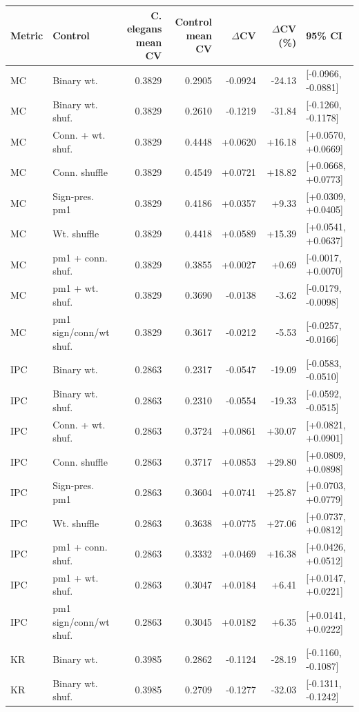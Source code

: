 \begin{tabular}{llrrrrl}
\toprule
Metric & Control & C. elegans mean CV & Control mean CV & $\Delta$CV & $\Delta$CV (\%) & 95\% CI \\
\midrule
MC & Binary wt. & 0.3829 & 0.2905 & -0.0924 & -24.13 & [-0.0966, -0.0881] \\
MC & Binary wt. shuf. & 0.3829 & 0.2610 & -0.1219 & -31.84 & [-0.1260, -0.1178] \\
MC & Conn. + wt. shuf. & 0.3829 & 0.4448 & +0.0620 & +16.18 & [+0.0570, +0.0669] \\
MC & Conn. shuffle & 0.3829 & 0.4549 & +0.0721 & +18.82 & [+0.0668, +0.0773] \\
MC & Sign-pres. pm1 & 0.3829 & 0.4186 & +0.0357 & +9.33 & [+0.0309, +0.0405] \\
MC & Wt. shuffle & 0.3829 & 0.4418 & +0.0589 & +15.39 & [+0.0541, +0.0637] \\
MC & pm1 + conn. shuf. & 0.3829 & 0.3855 & +0.0027 & +0.69 & [-0.0017, +0.0070] \\
MC & pm1 + wt. shuf. & 0.3829 & 0.3690 & -0.0138 & -3.62 & [-0.0179, -0.0098] \\
MC & pm1 sign/conn/wt shuf. & 0.3829 & 0.3617 & -0.0212 & -5.53 & [-0.0257, -0.0166] \\
IPC & Binary wt. & 0.2863 & 0.2317 & -0.0547 & -19.09 & [-0.0583, -0.0510] \\
IPC & Binary wt. shuf. & 0.2863 & 0.2310 & -0.0554 & -19.33 & [-0.0592, -0.0515] \\
IPC & Conn. + wt. shuf. & 0.2863 & 0.3724 & +0.0861 & +30.07 & [+0.0821, +0.0901] \\
IPC & Conn. shuffle & 0.2863 & 0.3717 & +0.0853 & +29.80 & [+0.0809, +0.0898] \\
IPC & Sign-pres. pm1 & 0.2863 & 0.3604 & +0.0741 & +25.87 & [+0.0703, +0.0779] \\
IPC & Wt. shuffle & 0.2863 & 0.3638 & +0.0775 & +27.06 & [+0.0737, +0.0812] \\
IPC & pm1 + conn. shuf. & 0.2863 & 0.3332 & +0.0469 & +16.38 & [+0.0426, +0.0512] \\
IPC & pm1 + wt. shuf. & 0.2863 & 0.3047 & +0.0184 & +6.41 & [+0.0147, +0.0221] \\
IPC & pm1 sign/conn/wt shuf. & 0.2863 & 0.3045 & +0.0182 & +6.35 & [+0.0141, +0.0222] \\
KR & Binary wt. & 0.3985 & 0.2862 & -0.1124 & -28.19 & [-0.1160, -0.1087] \\
KR & Binary wt. shuf. & 0.3985 & 0.2709 & -0.1277 & -32.03 & [-0.1311, -0.1242] \\

\end{tabular}
